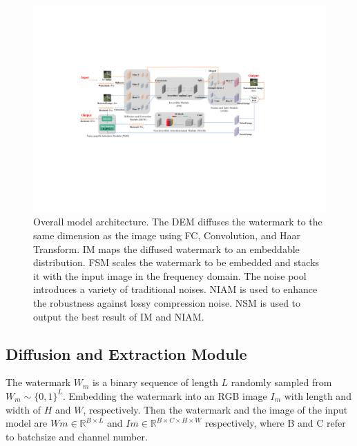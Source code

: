 \documentclass[sigconf]{acmart}
\begin{document}
\begin{figure}[]
	\centering
	\includegraphics[width=1.0\linewidth]{picture/Architecture_diagram.pdf}
	\caption{
		Overall model architecture. The DEM diffuses the watermark to the same dimension as the image using FC, Convolution, and Haar Transform. IM maps the diffused watermark to an embeddable distribution. FSM scales the watermark to be embedded and stacks it with the input image in the frequency domain. The noise pool introduces a variety of traditional noises. NIAM is used to enhance the robustness against lossy compression noise. NSM is used to output the best result of IM and NIAM.
	}
	\label{fig:Principle_diagram}
\end{figure}













\subsection{Diffusion and Extraction Module}
The watermark $W_{m}$ is a binary sequence of length $L$ randomly sampled from $W_{m} \sim\{0,1\}^{L}$. Embedding the watermark into an RGB image $I_{m}$ with length and width of $H$ and $W$, respectively. Then the watermark and the image of the input model are $Wm \in \mathbb{R}^{B\times L}$ and $Im \in \mathbb{R}^{B\times C\times H\times W}$ respectively, where B and C refer to batchsize and channel number.
\end{document}
